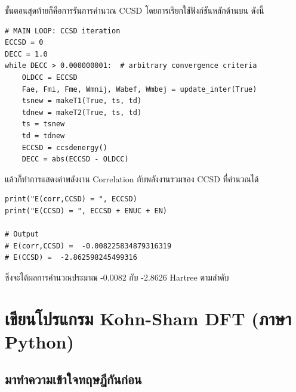 \vspace{5pt}

\noindent ขั้นตอนสุดท้ายก็คือการรันการคำนวณ CCSD โดยการเรียกใช้ฟังก์ชันหลักด้านบน ดังนี้

\vspace{5pt}

\begin{lstlisting}[style=MyPython]
# MAIN LOOP: CCSD iteration
ECCSD = 0
DECC = 1.0
while DECC > 0.000000001:  # arbitrary convergence criteria
    OLDCC = ECCSD
    Fae, Fmi, Fme, Wmnij, Wabef, Wmbej = update_inter(True)
    tsnew = makeT1(True, ts, td)
    tdnew = makeT2(True, ts, td)
    ts = tsnew
    td = tdnew
    ECCSD = ccsdenergy()
    DECC = abs(ECCSD - OLDCC)
\end{lstlisting}

\vspace{5pt}

\noindent แล้วก็ทำการแสดงค่าพลังงาน Correlation กับพลังงานรวมของ CCSD ที่คำนวณได้

\vspace{5pt}

\begin{lstlisting}[style=MyPython]
print("E(corr,CCSD) = ", ECCSD)
print("E(CCSD) = ", ECCSD + ENUC + EN)

# Output
# E(corr,CCSD) =  -0.008225834879316319
# E(CCSD) =  -2.862598245499316
\end{lstlisting}

\vspace{5pt}

\noindent ซึ่งจะได้ผลการคำนวณประมาณ -0.0082 กับ -2.8626 Hartree ตามลำดับ

\vspace{5pt}

\section{เขียนโปรแกรม Kohn-Sham DFT (ภาษา Python)}

\subsection{มาทำความเข้าใจทฤษฎีกันก่อน}

